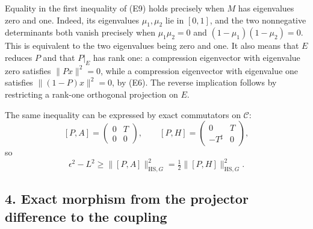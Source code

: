 Equality in the first inequality of (E9) holds precisely when \(M\) has eigenvalues zero and one. Indeed, its eigenvalues \(\mu_1,\mu_2\) lie in \([0,1]\), and the two nonnegative determinants both vanish precisely when \(\mu_1\mu_2=0\) and \((1-\mu_1)(1-\mu_2)=0\). This is equivalent to the two eigenvalues being zero and one. It also means that \(E\) reduces \(P\) and that \(P|_E\) has rank one: a compression eigenvector with eigenvalue zero satisfies \(\|Px\|^2=0\), while a compression eigenvector with eigenvalue one satisfies \(\|(1-P)x\|^2=0\), by (E6). The reverse implication follows by restricting a rank-one orthogonal projection on \(E\).

The same inequality can be expressed by exact commutators on \(\mathcal C\):
\[
[P,A]=\begin{pmatrix}0&T\\0&0\end{pmatrix},\qquad
[P,H]=\begin{pmatrix}0&T\\-T^\sharp&0\end{pmatrix},
\]
so
\[
\epsilon^2-L^2\geq\|[P,A]\|_{\mathrm{HS},G}^2
 =\tfrac12\|[P,H]\|_{\mathrm{HS},G}^2.
\tag{E12}
\]

\subsection{4. Exact morphism from the projector difference to the coupling}\label{exact-morphism-from-the-projector-difference-to-the-coupling}


